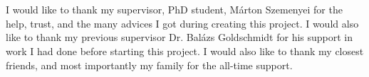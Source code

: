 \chapter*{\koszonetnyilvanitas}

I would like to thank my supervisor, PhD student, Márton Szemenyei for the help,
trust, and the many advices I got during creating this project. I would also like
to thank my previous supervisor Dr. Balázs Goldschmidt for his support in work I
had done before starting this project. I would also like to thank my closest
friends, and most importantly my family for the all-time support.